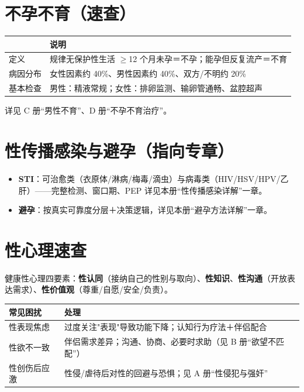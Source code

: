 \documentclass[12pt,UTF8,openany]{ctexbook}
\begin{document}
\section{不孕不育（速查）}

\begin{tabularx}{\textwidth}{lX}
\toprule
& 说明 \\
\midrule
定义 & 规律无保护性生活 $\ge$12 个月未孕＝不孕；能孕但反复流产＝不育 \\
病因分布 & 女性因素约 40\%、男性因素约 40\%、双方/不明约 20\% \\
基本检查 & 男性：精液常规；女性：排卵监测、输卵管通畅、盆腔超声 \\
\bottomrule
\end{tabularx}

\noindent 详见 C 册“男性不育”、D 册“不孕不育治疗”。

\section{性传播感染与避孕（指向专章）}

\begin{itemize}[leftmargin=2em,itemsep=0.3em]
  \item \textbf{STI}：可治愈类（衣原体/淋病/梅毒/滴虫）与病毒类（HIV/HSV/HPV/乙肝）——完整检测、窗口期、PEP 详见本册“性传播感染详解”一章。
  \item \textbf{避孕}：按真实可靠度分层＋决策逻辑，详见本册“避孕方法详解”一章。
\end{itemize}

\section{性心理速查}

\noindent 健康性心理四要素：\textbf{性认同}（接纳自己的性别与取向）、\textbf{性知识}、\textbf{性沟通}（开放表达需求）、\textbf{性价值观}（尊重/自愿/安全/负责）。

\begin{tabularx}{\textwidth}{lX}
\toprule
常见困扰 & 处理 \\
\midrule
性表现焦虑 & 过度关注"表现"导致功能下降；认知行为疗法＋伴侣配合 \\
性欲不一致 & 伴侣需求差异；沟通、协商、必要时求助（见 B 册“欲望不匹配”） \\
性创伤后应激 & 性侵/虐待后对性的回避与恐惧；见 A 册“性侵犯与强奸” \\
\bottomrule
\end{tabularx}
\end{document}
